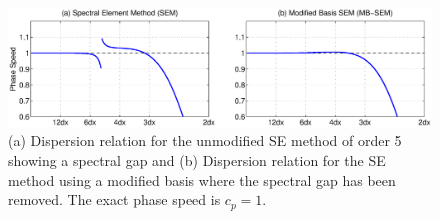 \documentclass[11pt]{article}
\begin{document}

\begin{figure}[t]
\begin{center}
\includegraphics[width=6.5in]{ModifiedBasisMethod}
\end{center}
\caption{(a) Dispersion relation for the unmodified SE method of order 5 showing a spectral gap and (b) Dispersion relation for the SE method using a modified basis where the spectral gap has been removed.  The exact phase speed is $c_p = 1$.} \label{fig:SEMDispersionGap}
\end{figure}
\end{document}
